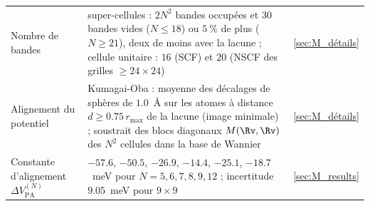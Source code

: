 \begin{table}[htbp]
\begin{tabular}{p{} p{} p{}}
        Nombre de bandes & super-cellules : $2N^2$ bandes occupées et $30$ bandes vides ($N\le 18$) ou $5~\%$ de plus ($N\ge 21$), deux de moins avec la lacune ; cellule unitaire : $16$ (SCF) et $20$ (NSCF des grilles $\ge 24\times 24$) & \ref{sec:M_détails} \\
        Alignement du potentiel & Kumagai-Oba : moyenne des décalages de sphères de $1.0$~\AA{} sur les atomes à distance $d \ge 0.75\,r_\text{max}$ de la lacune (image minimale) ; soustrait des blocs diagonaux $M(\Rv,\Rv)$ des $N^2$ cellules dans la base de Wannier & \ref{sec:M_détails} \\
        Constante d'alignement $\Delta V_\text{PA}^{(N)}$ & $-57.6$, $-50.5$, $-26.9$, $-14.4$, $-25.1$, $-18.7$~meV pour $N = 5, 6, 7, 8, 9, 12$ ; incertitude $9.05$~meV pour $9\times 9$ & \ref{sec:M_results} \\
        \hline\hline
    \end{tabular}
\end{table}

